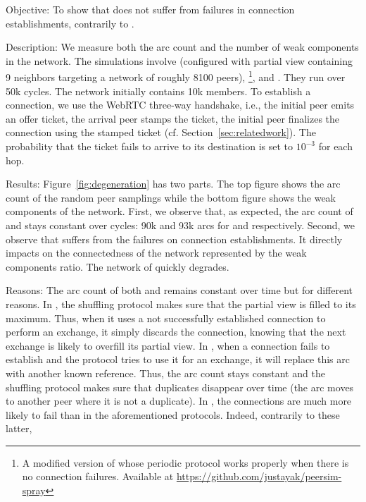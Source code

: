 \begin{asparadesc}
\item[Objective:] To show that \SPRAY does not suffer from failures in
  connection establishments, contrarily to \SCAMP.
\item[Description:] We measure both the arc count and the number of weak
  components in the network. The simulations involve \CYCLON (configured with
  partial view containing 9 neighbors targeting a network of roughly 8100
  peers), \SCAMP\footnote{A modified version of \SCAMP whose periodic protocol
    works properly when there is no connection failures. Available at
    \url{https://github.com/justayak/peersim-spray}}, and \SPRAY. They run over
  50k cycles. The network initially contains 10k members.  To establish a
  connection, we use the WebRTC three-way handshake, i.e., the initial peer
  emits an offer ticket, the arrival peer stamps the ticket, the initial peer
  finalizes the connection using the stamped ticket
  (cf. Section~\ref{sec:relatedwork}). The probability that the ticket fails to
  arrive to its destination is set to $10^{-3}$ for each hop.
\item[Results:] Figure~\ref{fig:degeneration} has two parts. The
  top figure shows the arc count of the random peer samplings while the bottom
  figure shows the weak components of the network.  First, we observe that, as
  expected, the arc count of \CYCLON and \SPRAY stays constant over cycles: 90k
  and 93k arcs for \CYCLON and \SPRAY respectively. Second, we observe that
  \SCAMP suffers from the failures on connection establishments. It directly
  impacts on the connectedness of the network represented by the weak
  components ratio. The network of \SCAMP quickly degrades.
\item[Reasons:] The arc count of both \CYCLON and \SPRAY remains constant over
  time but for different reasons. In \CYCLON, the shuffling protocol makes sure
  that the partial view is filled to its maximum. Thus, when it uses a not
  successfully established connection to perform an exchange, it simply discards
  the connection, knowing that the next exchange is likely to overfill its
  partial view. In \SPRAY, when a connection fails to establish and the protocol
  tries to use it for an exchange, it will replace this arc with another known
  reference. Thus, the arc count stays constant and the shuffling protocol makes
  sure that duplicates disappear over time (the arc moves to another peer where
  it is not a duplicate). In \SCAMP, the connections are much more likely to
  fail than in the aforementioned protocols. Indeed, contrarily to these latter,

\end{asparadesc}
